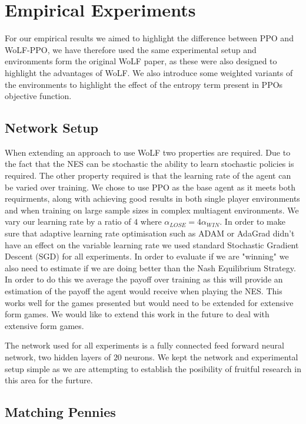 \documentclass[conference]{IEEEtran}
\begin{document}
\section{Empirical Experiments}

For our empirical results we aimed to highlight the difference between PPO and WoLF-PPO, we have therefore used the same experimental setup and environments form the original WoLF paper, as these were also designed to highlight the advantages of WoLF. We also introduce some weighted variants of the environments to highlight the effect of the entropy term present in PPOs objective function.

\subsection{Network Setup}

When extending an approach to use WoLF two properties are required. Due to the fact that the NES can be stochastic the ability to learn stochastic policies is required. The other property required is that the learning rate of the agent can be varied over training. We chose to use PPO as the base agent as it meets both requirments, along with achieving good results in both single player environments and when training on large sample sizes in complex multiagent environments\cite{OpenAI_dota}. We vary our learning rate by a ratio of $4$ where $\alpha_{LOSE} = 4\alpha_{WIN}$. In order to make sure that adaptive learning rate optimisation such as ADAM or AdaGrad didn't have an effect on the variable learning rate we used standard Stochastic Gradient Descent (SGD) for all experiments. In order to evaluate if we are "winning" we also need to estimate if we are doing better than the Nash Equilibrium Strategy. In order to do this we average the payoff over training as this will provide an estimation of the payoff the agent would receive when playing the NES. This works well for the games presented but would need to be extended for extensive form games. We would like to extend this work in the future to deal with extensive form games.

The network used for all experiments is a fully connected feed forward neural network, two hidden layers of $20$ neurons. We kept the network and experimental setup simple as we are attempting to establish the posibility of fruitful research in this area for the furture.

\subsection{Matching Pennies}
\end{document}
